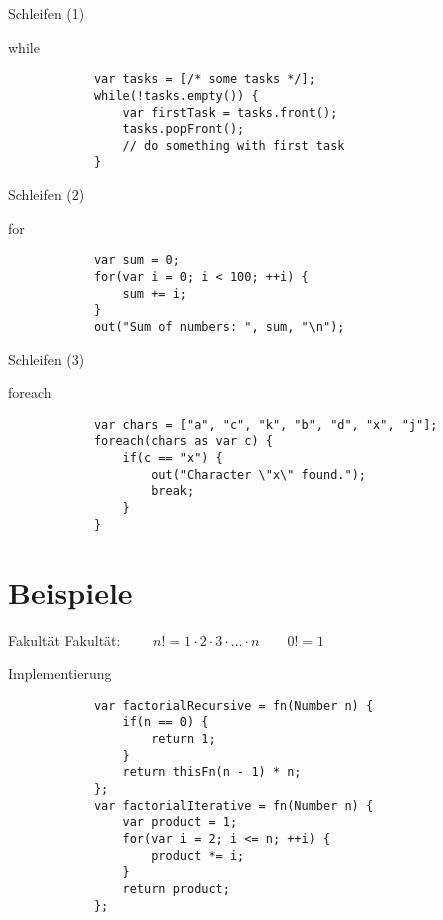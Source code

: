 \documentclass[ucs,9pt]{beamer}
\begin{document}
\begin{frame}[fragile]{Schleifen (1)}
	\begin{block}{while}
		\begin{lstlisting}
			var tasks = [/* some tasks */];
			while(!tasks.empty()) {
			    var firstTask = tasks.front();
			    tasks.popFront();
			    // do something with first task
			}
		\end{lstlisting}
	\end{block}
\end{frame}

\begin{frame}[fragile]{Schleifen (2)}
	\begin{block}{for}
		\begin{lstlisting}
			var sum = 0;
			for(var i = 0; i < 100; ++i) {
			    sum += i;
			}
			out("Sum of numbers: ", sum, "\n");
		\end{lstlisting}
	\end{block}
\end{frame}

\begin{frame}[fragile]{Schleifen (3)}
	\begin{block}{foreach}
		\begin{lstlisting}
			var chars = ["a", "c", "k", "b", "d", "x", "j"];
			foreach(chars as var c) {
			    if(c == "x") {
			        out("Character \"x\" found.");
			        break;
			    }
			}
		\end{lstlisting}
	\end{block}
\end{frame}

\section{Beispiele}

\begin{frame}[fragile]{Fakultät}
	Fakultät: $\qquad n! = 1 \cdot 2 \cdot 3 \cdot \ldots \cdot n \qquad 0! = 1$
	\begin{block}{Implementierung}
		\begin{lstlisting}
			var factorialRecursive = fn(Number n) {
			    if(n == 0) {
			        return 1;
			    }
			    return thisFn(n - 1) * n;
			};
			var factorialIterative = fn(Number n) {
			    var product = 1;
			    for(var i = 2; i <= n; ++i) {
			        product *= i;
			    }
			    return product;
			};
		\end{lstlisting}
	\end{block}
\end{frame}
\end{document}
